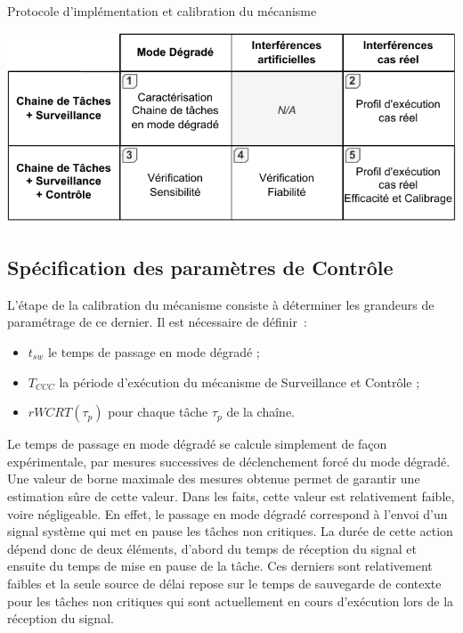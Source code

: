 \documentclass[french, a4paper, 11pt, twoside, pdftex]{StyleThese}
\begin{document}
		
		\begin{table}[ht]
			\centering
			\caption{Protocole d'implémentation et calibration du mécanisme}
			\label{tab:tableprotocoleImplementation}
			\includegraphics[width=0.8\linewidth]{tables/Table_Protocole_Implem}
		\end{table}
	
\pagebreak            
            
    \subsection{Spécification des paramètres de Contrôle}
    	L'étape  de la calibration du mécanisme consiste à déterminer les grandeurs de paramétrage de ce dernier. Il est nécessaire de définir~: 
    	\begin{itemize}
    		\item $t_{sw}$ le temps de passage en mode dégradé ;
    		\item $T_{CCC}$ la période d'exécution du mécanisme de Surveillance et Contrôle ;
    		\item $rWCRT(\tau_{p})$ pour chaque tâche $\tau_p$ de la chaîne.
    	\end{itemize}
    
    	Le temps de passage en mode dégradé se calcule simplement de façon expérimentale, par mesures successives de déclenchement forcé du mode dégradé. Une valeur de borne maximale des mesures obtenue permet de garantir une estimation sûre de cette valeur. Dans les faits, cette valeur est relativement faible, voire négligeable. En effet, le passage en mode dégradé correspond à l'envoi d'un signal système qui met en pause les tâches non critiques. La durée de cette action dépend donc de deux éléments, d'abord du temps de réception du signal et ensuite du temps de mise en pause de la tâche. Ces derniers sont relativement faibles et la seule source de délai repose sur le temps de sauvegarde de contexte pour les tâches non critiques qui sont actuellement en cours d'exécution lors de la réception du signal.
    
\end{document}
